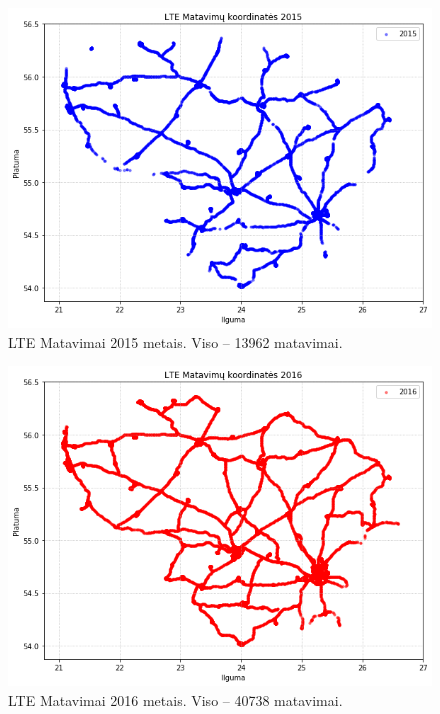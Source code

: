 \documentclass{VUMIFPSbakalaurinis}
\begin{document}
\begin{figure}[H]
	\centering
	\includegraphics[scale=0.33]{img/LTE-2}
	\caption{LTE Matavimai 2015 metais. Viso – 13962 matavimai.}
	\label{img:LTE-2}
\end{figure}
\begin{figure}[H]
	\centering
	\includegraphics[scale=0.33]{img/LTE-3}
	\caption{LTE Matavimai 2016 metais. Viso – 40738 matavimai.}
	\label{img:LTE-3}
\end{figure}
\end{document}
